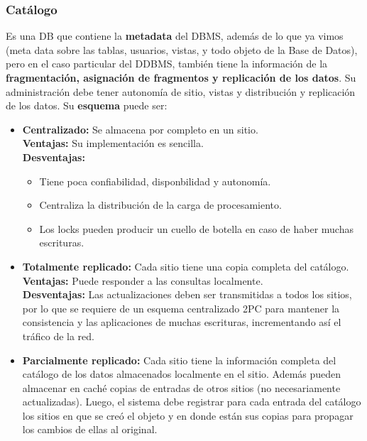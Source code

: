 \subsubsection*{Catálogo}
Es una DB que contiene la \textbf{metadata} del DBMS, además de lo que ya vimos (meta data sobre las tablas, usuarios, vistas, y todo objeto de la Base de Datos), pero en el caso particular del DDBMS, también tiene la información de la \textbf{fragmentación, asignación de fragmentos y replicación de los datos}. Su administración debe tener autonomía de sitio, vistas y distribución y replicación de los datos. Su \textbf{esquema} puede ser:
\begin{itemize}
    \item \textbf{Centralizado:} Se almacena por completo en un sitio. \\
    \textbf{Ventajas:} Su implementación es sencilla. \\
    \textbf{Desventajas:}
    \begin{itemize}
        \item Tiene poca confiabilidad, disponbilidad y autonomía.
        \item Centraliza la distribución de la carga de procesamiento.
        \item Los locks pueden producir un cuello de botella en caso de haber muchas escrituras.
    \end{itemize}
    \item \textbf{Totalmente replicado:} Cada sitio tiene una copia completa del catálogo. \\
    \textbf{Ventajas:} Puede responder a las consultas localmente. \\
    \textbf{Desventajas:} Las actualizaciones deben ser transmitidas a todos los sitios, por lo que se requiere de un esquema centralizado 2PC para mantener la consistencia y las aplicaciones de muchas escrituras, incrementando así el tráfico de la red.
    \item \textbf{Parcialmente replicado:} Cada sitio tiene la información completa del catálogo de los datos almacenados localmente en el sitio. Además pueden almacenar en caché copias de entradas de otros sitios (no necesariamente actualizadas). Luego, el sistema debe registrar para cada entrada del catálogo los sitios en que se creó el objeto y en donde están sus copias para propagar los cambios de ellas al original.
\end{itemize}

